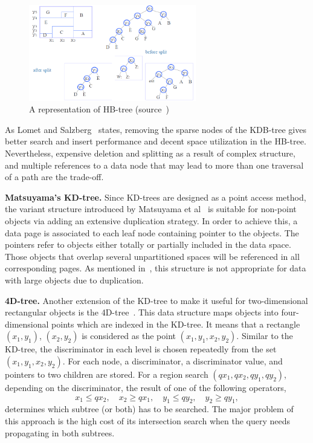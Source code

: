 \documentclass[a4paper,12pt]{article}
\begin{document}
\begin{figure}
\centering
\includegraphics[width=0.65\textwidth,height=0.2\textheight]{hbtree}
\caption{A representation of HB-tree (source~\cite{hbtree1})}
\label{fighbtree}
\end{figure}

As Lomet and Salzberg~\cite{hbtree1} states, removing the sparse nodes of the KDB-tree gives better search and insert performance and decent space utilization in the HB-tree. Nevertheless, expensive deletion and splitting as a result of complex structure, and multiple references to a data node that may lead to more than one traversal of a path are the trade-off.

\textbf{Matsuyama's KD-tree.} Since KD-trees are designed as a point access method, the variant structure introduced by Matsuyama et al~\cite{matsuyama} is suitable for non-point objects via adding an extensive duplication strategy. In order to achieve this, a data page is associated to each leaf node containing pointer to the objects. The pointers refer to objects either totally or partially included in the data space. Those objects that overlap several unpartitioned spaces will be referenced in all corresponding pages. As mentioned in~\cite{survey}, this structure is not appropriate for data with large objects due to duplication.

\textbf{4D-tree.} Another extension of the KD-tree to make it useful for two-dimensional rectangular objects is the 4D-tree~\cite{4dtree}. This data structure maps objects into four-dimensional points which are indexed in the KD-tree. It means that a rectangle $(x‍‍_1, y_1)$, $(x_2, y_2)$ is considered as the point $(x‍‍_1, y_1, x_2, y_2)$. Similar to the KD-tree, the discriminator in each level is chosen repeatedly from the set $(x‍‍_1, y_1, x_2, y_2)$. For each node, a discriminator, a discriminator value, and pointers to two children are stored. 
For a region search $(qx_1, qx_2, qy_1, qy_2)$, depending on the discriminator, the result of one of the following operators,
$$x_1 \leq qx_2, \quad x_2 \geq qx_1, \quad y_1 \leq qy_2, \quad y_2 \geq qy_1,$$ 
determines which subtree (or both) has to be searched.
The major problem of this approach is the high cost of its intersection search when the query needs propagating in both subtrees. 
\end{document}
